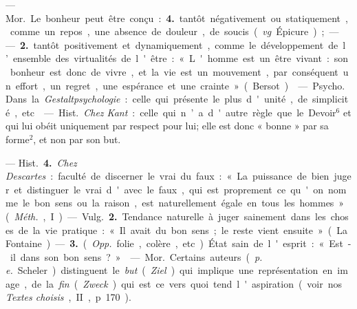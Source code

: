 \begin{itemize}[leftmargin=1cm, label=, itemsep=1pt]
 — \si{Mor.} Le bonheur peut
être conçu : {\bf 4.} tantôt négativement
ou statiquement, comme un repos,
une absence de douleur, de soucis
({\it vg}. Épicure); —— {\bf 2.} tantôt positivement et dynamiquement, comme le
développement de l’ensemble des
virtualités de l'être : « L'homme est
un être vivant : son bonheur est
donc de vivre, et la vie est un mouvement, par conséquent un effort,
un regret, une espérance et une
crainte » (Bersot).

 — \si{Psycho.} Dans la
{\it Gestaltpsychologie} : celle qui présente
le plus d'unité, de simplicité, etc.

 — \si{Hist.} {\it Chez Kant} :
celle qui n’a d'autre règle que le
Devoir$^6$ et qui lui obéit uniquement
par respect pour lui; elle est donc
« bonne » par sa forme$^2$, et non par
son but.

 — \si{Hist.} {\bf 4.} {\it Chez Descartes} :
faculté de discerner le vrai du faux :
« La puissance de bien juger et distinguer le vrai d'avec le faux, qui
est proprement ce qu'on nomme le
bon sens ou la raison, est naturellement égale en tous les hommes »
({\it Méth.}, I).

— \si{Vulg.} {\bf 2.} Tendance naturelle à
juger sainement dans les choses de
la vie pratique : « Il avait du bon
sens; le reste vient ensuite » (La
Fontaine). — {\bf 3.} ({\it Opp.} folie, colère,
etc.). État sain de l'esprit : « Est-il
dans son bon sens ? »

 — \si{Mor.} Certains auteurs ({\it p. e.}
Scheler) distinguent le {\it but} ({\it Ziel}) qui
implique une représentation en
image, de la {\it fin} ({\it Zweck}) qui est ce
vers quoi tend l'aspiration (voir nos
{\it Textes choisis}, II, p. 170).

	\end{itemize}
